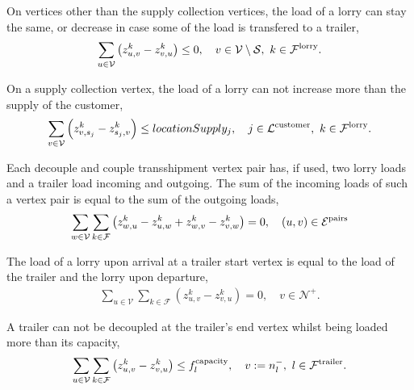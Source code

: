 On vertices other than the supply collection vertices, the load of a lorry can stay the same, or decrease in case some of the load is transfered to a trailer,
\begin{align}
  \sum_{u \in \mathcal V} \left( z^k_{u,v} - z^k_{v,u} \right)  \leq 0, \quad
  v \in \mathcal V \setminus \mathcal S,
  \ k \in \mathcal F^{\rm lorry}.
\end{align}


On a supply collection vertex, the load of a lorry can not increase more than the supply of the customer,
\begin{align}
  \sum_{v \in \mathcal V} \left( z^k_{v,s_j} - z^k_{s_j,v} \right)  \leq locationSupply_j, \quad
  j \in \mathcal L^{\rm customer},
  \ k \in \mathcal F^{\rm lorry}.
\end{align}

Each decouple and couple transshipment vertex pair has, if used, two lorry loads and a trailer load incoming and outgoing.
The sum of the incoming loads of such a vertex pair is equal to the sum of the  outgoing loads,
\begin{align}
  \sum_{w \in \mathcal V}
  \sum_{k \in \mathcal F}
  \left(
  z^k_{w,u} -  z^k_{u,w}  + z^k_{w,v} - z^k_{v,w}
  \right)
  = 0,  \quad
  (u,v) \in \mathcal E^{\rm pairs}
\end{align}





The load of a lorry upon arrival at a trailer start vertex is equal to the load of the trailer and the lorry upon departure,
\begin{align}
  \sum_{u \in \mathcal V} \sum_{k \in \mathcal F}
  \left( z^k_{u,v} - z^k_{v,u} \right) = 0, \quad
  v \in \mathcal N^+.
\end{align}






A trailer can not be decoupled at the trailer's end vertex whilst being loaded more than its capacity,
\begin{align}
  \sum_{u \in \mathcal V}
  \sum_{k \in \mathcal F}
  \left(
  z^k_{u,v} - z^k_{v,u}
  \right) \leq f_l^{\rm capacity} , \quad
  v :=  n^-_l,
   \ l \in \mathcal F^{\rm trailer}.
\end{align}






